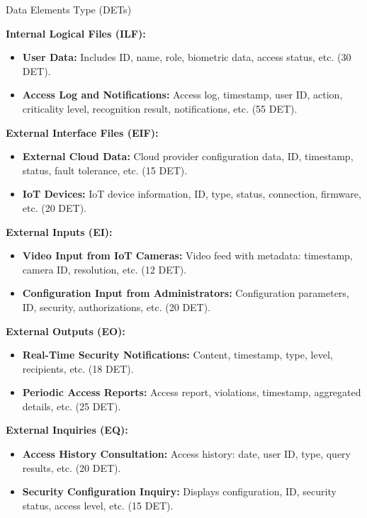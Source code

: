 \documentclass[12pt]{beamer}
\begin{document}
\begin{frame}[allowframebreaks]{Data Elements Type (DETs)}
\small

\textbf{Internal Logical Files (ILF):}

\begin{itemize}
    \item \textbf{User Data:} Includes ID, name, role, biometric data, access status, etc. (30 DET).
    \item \textbf{Access Log and Notifications:} Access log, timestamp, user ID, action, criticality level, recognition result, notifications, etc. (55 DET).
\end{itemize}

\textbf{External Interface Files (EIF):}

\begin{itemize}
    \item \textbf{External Cloud Data:} Cloud provider configuration data, ID, timestamp, status, fault tolerance, etc. (15 DET).
    \item \textbf{IoT Devices:} IoT device information, ID, type, status, connection, firmware, etc. (20 DET).
\end{itemize}

\framebreak

\textbf{External Inputs (EI):}

\begin{itemize}
    \item \textbf{Video Input from IoT Cameras:} Video feed with metadata: timestamp, camera ID, resolution, etc. (12 DET).
    \item \textbf{Configuration Input from Administrators:} Configuration parameters, ID, security, authorizations, etc. (20 DET).
\end{itemize}

\textbf{External Outputs (EO):}

\begin{itemize}
    \item \textbf{Real-Time Security Notifications:} Content, timestamp, type, level, recipients, etc. (18 DET).
    \item \textbf{Periodic Access Reports:} Access report, violations, timestamp, aggregated details, etc. (25 DET).
\end{itemize}

\framebreak

\textbf{External Inquiries (EQ):}

\begin{itemize}
    \item \textbf{Access History Consultation:} Access history: date, user ID, type, query results, etc. (20 DET).
    \item \textbf{Security Configuration Inquiry:} Displays configuration, ID, security status, access level, etc. (15 DET).
\end{itemize}
\end{frame}
\end{document}
